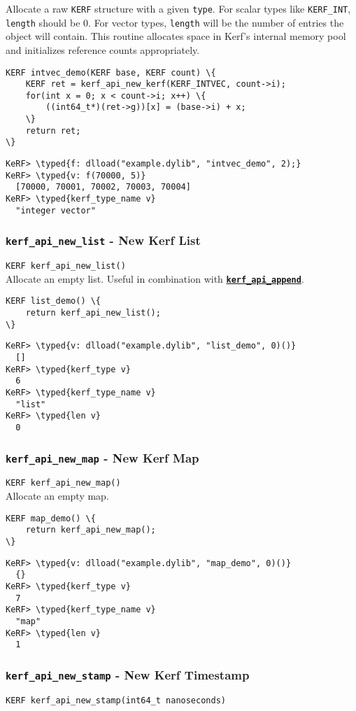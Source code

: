 \documentclass{article}
\newcommand{\typed}[1]{\textcolor{TealBlue}{#1}}
\newcommand{\ffidef}[3]{\subsubsection{\texttt{#1} - #2}\label{ffi:#3}}
\newcommand{\ffi}[2]{\hyperref[ffi:#2]{\textbf{\texttt{#1}}}}
\begin{document}
Allocate a raw \texttt{KERF} structure with a given \texttt{type}. For scalar types like \texttt{KERF\_INT}, \texttt{length} should be 0. For vector types, \texttt{length} will be the number of entries the object will contain. This routine allocates space in Kerf's internal memory pool and initializes reference counts appropriately.

\begin{Verbatim}
KERF intvec_demo(KERF base, KERF count) \{
	KERF ret = kerf_api_new_kerf(KERF_INTVEC, count->i);
	for(int x = 0; x < count->i; x++) \{
		((int64_t*)(ret->g))[x] = (base->i) + x;
	\}
	return ret;
\}
\end{Verbatim}
\begin{Verbatim}
KeRF> \typed{f: dlload("example.dylib", "intvec_demo", 2);}
KeRF> \typed{v: f(70000, 5)}
  [70000, 70001, 70002, 70003, 70004]
KeRF> \typed{kerf_type_name v}
  "integer vector"
\end{Verbatim}

\pagebreak
\ffidef{kerf\_api\_new\_list}{New Kerf List}{kerfApiNewList}
\texttt{KERF kerf\_api\_new\_list()}\\

Allocate an empty list. Useful in combination with \ffi{kerf\_api\_append}{kerfApiAppend}.
\begin{Verbatim}
KERF list_demo() \{
	return kerf_api_new_list();
\}
\end{Verbatim}
\begin{Verbatim}
KeRF> \typed{v: dlload("example.dylib", "list_demo", 0)()}
  []
KeRF> \typed{kerf_type v}
  6
KeRF> \typed{kerf_type_name v}
  "list"
KeRF> \typed{len v}
  0
\end{Verbatim}

\ffidef{kerf\_api\_new\_map}{New Kerf Map}{kerfApiNewMap}
\texttt{KERF kerf\_api\_new\_map()}\\

Allocate an empty map.
\begin{Verbatim}
KERF map_demo() \{
	return kerf_api_new_map();
\}
\end{Verbatim}
\begin{Verbatim}
KeRF> \typed{v: dlload("example.dylib", "map_demo", 0)()}
  {}
KeRF> \typed{kerf_type v}
  7
KeRF> \typed{kerf_type_name v}
  "map"
KeRF> \typed{len v}
  1
\end{Verbatim}

\pagebreak
\ffidef{kerf\_api\_new\_stamp}{New Kerf Timestamp}{kerfApiNewStamp}
\texttt{KERF kerf\_api\_new\_stamp(int64\_t nanoseconds)}\\
\end{document}
